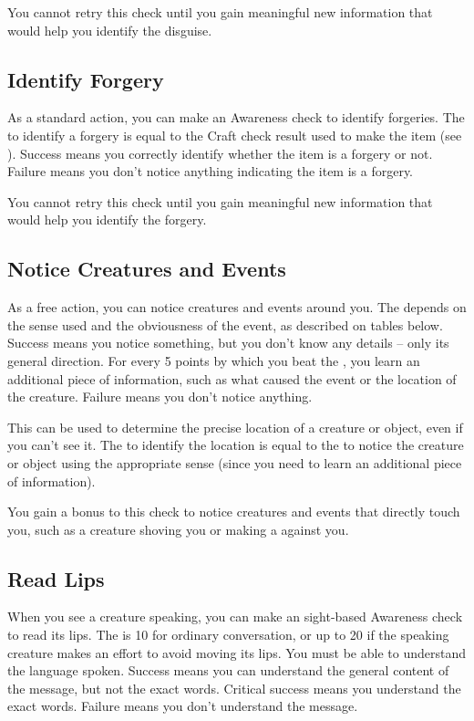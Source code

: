         You cannot retry this check until you gain meaningful new information that would help you identify the disguise.

    \subsection{Identify Forgery}
        As a standard action, you can make an Awareness check to identify forgeries.
        The  to identify a forgery is equal to the Craft check result used to make the item (see ).
        Success means you correctly identify whether the item is a forgery or not.
        Failure means you don't notice anything indicating the item is a forgery.

        You cannot retry this check until you gain meaningful new information that would help you identify the forgery.

    \subsection{Notice Creatures and Events}\label{Notice Creatures and Events}
        As a free action, you can notice creatures and events around you.
        The  depends on the sense used and the obviousness of the event, as described on tables below.
        Success means you notice something, but you don't know any details -- only its general direction.
        For every 5 points by which you beat the , you learn an additional piece of information, such as what caused the event or the location of the creature.
        Failure means you don't notice anything.

        This can be used to determine the precise location of a creature or object, even if you can't see it. The  to identify the location is equal to the  to notice the creature or object using the appropriate sense  (since you need to learn an additional piece of information).

        You gain a  bonus to this check to notice creatures and events that directly touch you, such as a creature shoving you or making a  against you.

    \subsection{Read Lips}
        When you see a creature speaking, you can make an sight-based Awareness check to read its lips.
        The  is 10 for ordinary conversation, or up to 20 if the speaking creature makes an effort to avoid moving its lips.
        You must be able to understand the language spoken.
        Success means you can understand the general content of the message, but not the exact words.
        Critical success means you understand the exact words.
        Failure means you don't understand the message.

